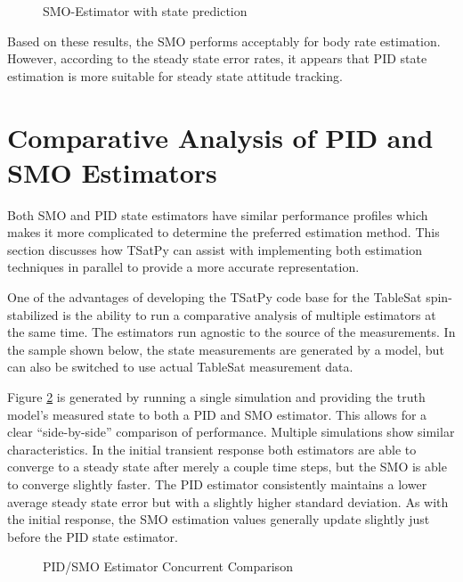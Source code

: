 \begin{figure}[H]
  \centerline{}
  \caption{SMO-Estimator with state prediction}
  \label{fig:SMOEstimatorwithstateprediction}
\end{figure}

Based on these results, the SMO performs acceptably for body rate estimation.  However, according to the steady state error rates, it appears that PID state estimation is more suitable for steady state attitude tracking.

\section{Comparative Analysis of PID and SMO Estimators}
\label{sec:ComparativeAnalysysofPIDandSMOEstimators}

Both SMO and PID state estimators have similar performance profiles which makes it more complicated to determine the preferred estimation method.  This section discusses how TSatPy can assist with implementing both estimation techniques in parallel to provide a more accurate representation.

One of the advantages of developing the TSatPy code base for the TableSat spin-stabilized is the ability to run a comparative analysis of multiple estimators at the same time.  The estimators run agnostic to the source of the measurements.  In the sample shown below, the state measurements are generated by a model, but can also be switched to use actual TableSat measurement data.

Figure \ref{fig:PIDSMOEstimatorConcurrentComparison} is generated by running a single simulation and providing the truth model's measured state to both a PID and SMO estimator.  This allows for a clear ``side-by-side'' comparison of performance.  Multiple simulations show similar characteristics.  In the initial transient response both estimators are able to converge to a steady state after merely a couple time steps, but the SMO is able to converge slightly faster.  The PID estimator consistently maintains a lower average steady state error but with a slightly higher standard deviation.  As with the initial response, the SMO estimation values generally update slightly just before the PID state estimator.

\begin{figure}[H]
  \centerline{}
  \caption{PID/SMO Estimator Concurrent Comparison}
  \label{fig:PIDSMOEstimatorConcurrentComparison}
\end{figure}

